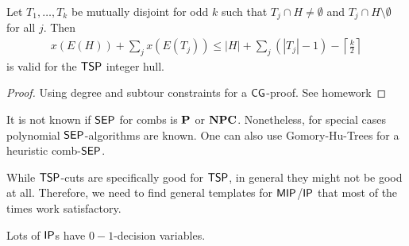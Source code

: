 \begin{theorem}
    Let $T_1, \dots, T_k$ be mutually disjoint for odd $k$ such that
    $T_j \cap H \neq \emptyset$ and $T_j \cap H \setminus \emptyset$ for all $j$.
    Then
    \begin{align*}
        x(E(H))+ \sum_jx(E(T_j))\leq |H|+\sum_j(|T_j|-1) - \left\lceil \frac{k}{2} \right\rceil
    \end{align*}
    is valid for the $\mathsf{TSP}$ integer hull.
\end{theorem}
\begin{proof}
    Using degree and subtour constraints for a $\mathsf{CG}$-proof. See homework 
\end{proof}
\begin{remark}
    It is not known if $\mathsf{SEP}$ for combs is $\mathbf{P}$ or $\mathbf{NPC}$.
    Nonetheless, for special cases polynomial $\mathsf{SEP}$-algorithms are known.
    One can also use Gomory-Hu-Trees for a heuristic comb-$\mathsf{SEP}$.
\end{remark}
While $\mathsf{TSP}$-cuts are specifically good for $\mathsf{TSP}$, in general they might not be good at all.
Therefore, we need to find general templates for $\mathsf{MIP}$/$\mathsf{IP}$ that most of the times work satisfactory.

Lots of $\mathsf{IP}$s have $0-1$-decision variables.

